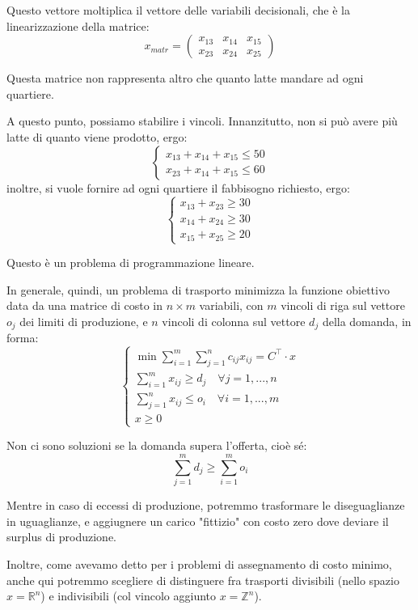 \documentclass[a4paper,11pt]{article}
\begin{document}
Questo vettore moltiplica il vettore delle variabili decisionali, che è la linearizzazione della matrice:
$$
x_{matr} =
\begin{pmatrix}
	x_{13} & x_{14} & x_{15} \\ 
	x_{23} & x_{24} & x_{25}
\end{pmatrix}
$$

Questa matrice non rappresenta altro che quanto latte mandare ad ogni quartiere.

A questo punto, possiamo stabilire i vincoli.
Innanzitutto, non si può avere più latte di quanto viene prodotto, ergo:
\[
	\begin{cases}
		x_{13} + x_{14} + x_{15} \leq 50 \\ 
		x_{23} + x_{14} + x_{15} \leq 60
	\end{cases}
\]
inoltre, si vuole fornire ad ogni quartiere il fabbisogno richiesto, ergo:
\[
	\begin{cases}
		x_{13} + x_{23} \geq 30 \\	
		x_{14} + x_{24} \geq 30	\\
		x_{15} + x_{25} \geq 20	
	\end{cases}
\]

Questo è un problema di programmazione lineare.

In generale, quindi, un problema di trasporto minimizza la funzione obiettivo data da una matrice di costo in $n \times m$ variabili, con $m$ vincoli di riga sul vettore $o_j$ dei limiti di produzione, e $n$ vincoli di colonna sul vettore $d_j$ della domanda, in forma:
\[
	\begin{cases}
		\min{\sum^m_{i=1} \sum^n_{j=1} c_{ij}x_{ij}} = C^\intercal \cdot x \\
		\sum^m_{i=1} x_{ij} \geq d_{j} \quad \forall j = 1,...,n \\ 
		\sum^n_{j=1} x_{ij} \leq o_{i} \quad \forall i = 1,...,m \\ 
		x \geq 0
	\end{cases}
\]

Non ci sono soluzioni se la domanda supera l'offerta, cioè sé:
$$
\sum_{j=1}^m d_j \geq \sum_{i=1}^m o_i
$$

Mentre in caso di eccessi di produzione, potremmo trasformare le diseguaglianze in uguaglianze, e aggiugnere un carico "fittizio" con costo zero dove deviare il surplus di produzione.

Inoltre, come avevamo detto per i problemi di assegnamento di costo minimo, anche qui potremmo scegliere di distinguere fra trasporti divisibili (nello spazio $x = \mathbb{R}^n$) e indivisibili (col vincolo aggiunto $x = \mathbb{Z}^n$).
\end{document}
